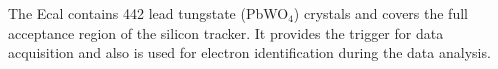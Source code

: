 \documentclass[b1]{sciposter}
\begin{document}
\begin{multicols}{3}
The Ecal contains 442 lead tungstate (PbWO$_4$) crystals and covers the full acceptance region of the silicon tracker.  It provides the trigger for data acquisition and also
	is used for electron identification during the data analysis. \cite{Balossino:2016nly}
	







\end{multicols}
\end{document}
